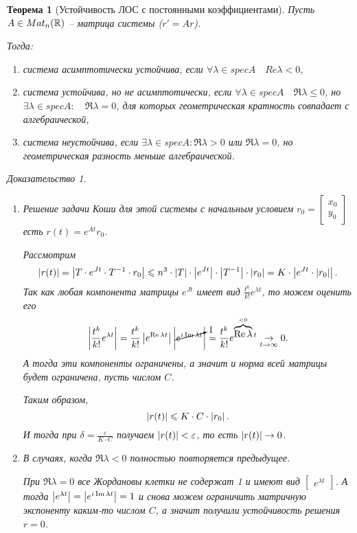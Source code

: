 \documentclass[a5paper, 10pt]{article}
\theoremstyle{definition}
\theoremstyle{plain}
\newtheorem{Th}{Теорема}
\theoremstyle{remark}
\newtheorem*{Proof}{Доказательство}
\begin{document}
	\begin{Th}[Устойчивость ЛОС с постоянными коэффициентами]
		Пусть $A \in Mat_n(\mathbb{R})$ -- матрица системы ($r'=Ar$).
		
		Тогда:
		\begin{enumerate}
			\item система асимптотически устойчива, если $\forall \lambda \in spec A \quad Re \lambda < 0$,
			\item система устойчива, но не асимптотически, если $\forall \lambda \in spec A \quad \Re \lambda \leqslant 0$, но $\exists \lambda \in spec A: \quad \Re \lambda = 0$, для которых геометрическая кратность совпадает с алгебраической,
			\item система неустойчива, если $\exists \lambda \in spec A: \Re \lambda > 0$ или $\Re \lambda = 0$, но геометрическая разность меньше алгебраической.
		\end{enumerate}
		
		\begin{Proof}
			\begin{enumerate}
				\item Решение задачи Коши для этой системы с начальным условием $r_0 = \begin{bmatrix}
					x_0\\y_0
				\end{bmatrix}$ есть $r(t) = e^{At} r_0$.
			
				Рассмотрим 
				\[
				\left|r(t)\right| = \left|T \cdot e^{Jt} \cdot T^{-1} \cdot r_0\right| \leqslant n^3 \cdot \left|T\right| \cdot \left|e^{Jt}\right| \cdot \left|T^{-1}\right| \cdot \left|r_0\right| = K \cdot \left|e^{Jt} \cdot \left|r_0\right|\right|.
				\]
				Так как любая компонента матрицы $e^{Jt}$ имеет вид $\frac{t^k}{k!}e^{\lambda t}$, то можем оценить его
				\[
				\left|\frac{t^k}{k!}e^{\lambda t}\right| = \frac{t^k}{k!}\left|e^{\mathop{\mathrm{Re}}\lambda t}\right| \left|\cancelto{1}{e^{i\mathop{\mathrm{Im}}\lambda t}}\right| =    \frac{t^k}{k!} e^{\overbrace{\mathop{\mathrm{Re}}\lambda}^{<0} t} \underset{t\rightarrow\infty}{\rightarrow} 0.
				\]
				А тогда эти компоненты ограничены, а значит и норма всей матрицы будет ограничена, пусть числом $C$.
				
				Таким образом, 
				\[
				\left|r(t)\right| \leqslant K \cdot C \cdot \left|r_0\right|.
				\]
				И тогда при $\delta = \frac{\varepsilon}{K\cdot C}$ получаем $\left|r(t)\right| < \varepsilon$, то есть $\left|r(t)\right| \rightarrow 0$.
				\item В случаях, когда $\Re \lambda < 0$ полностью повторяется предыдущее. 
				
				При $\Re \lambda = 0$ все Жордановы клетки не содержат 1 и имеют вид $\begin{bmatrix}
					e^{\lambda t}
				\end{bmatrix}$. А тогда $\left|e^{\lambda t}\right| = \left|e^{i \mathop{\mathrm{Im}} \lambda t}\right| = 1$ и снова можем ограничить матричную экспоненту каким-то числом $C$, а значит получили устойчивость решения $r=0$.
			

\end{enumerate}
\end{Proof}
\end{Th}
\end{document}
